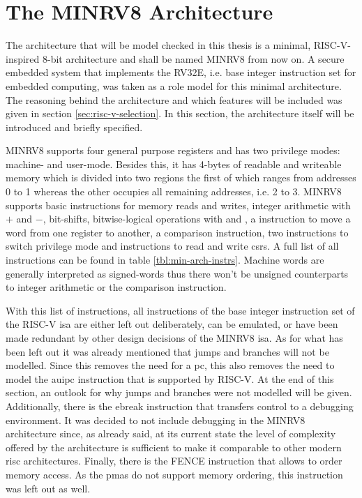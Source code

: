 \section{The MINRV8 Architecture}
\label{sec:minrv8}

The architecture that will be model checked in this thesis is a minimal, RISC-V-inspired 8-bit architecture and shall be named MINRV8 from now on.
A secure embedded system that implements the RV32E, i.e. base integer instruction set for embedded computing, was taken as a role model for this minimal architecture.
The reasoning behind the architecture and which features will be included was given in section \ref{sec:risc-v-selection}.
In this section, the architecture itself will be introduced and briefly specified.

MINRV8 supports four general purpose registers and has two privilege modes: machine- and user-mode.
Besides this, it has 4-bytes of readable and writeable memory which is divided into two regions the first of which ranges from addresses 0 to 1 whereas the other occupies all remaining addresses, i.e. 2 to 3.
MINRV8 supports basic instructions for memory reads and writes, integer arithmetic with $ + $ and $ - $, bit-shifts, bitwise-logical operations with  and , a  instruction to move a word from one register to another, a comparison instruction, two instructions to switch privilege mode and instructions to read and write \glspl{csr}.
A full list of all instructions can be found in table \ref{tbl:min-arch-instrs}.
Machine words are generally interpreted as signed-words thus there won't be unsigned counterparts to integer arithmetic or the comparison instruction.

With this list of instructions, all instructions of the base integer instruction set of the RISC-V \gls{isa} are either left out deliberately, can be emulated, or have been made redundant by other design decisions of the MINRV8 \gls{isa}.
As for what has been left out it was already mentioned that jumps and branches will not be modelled.
Since this removes the need for a \gls{pc}, this also removes the need to model the \gls{auipc} instruction that is supported by RISC-V.
At the end of this section, an outlook for why jumps and branches were not modelled will be given.
Additionally, there is the \gls{ebreak} instruction that transfers control to a debugging environment.
It was decided to not include debugging in the MINRV8 architecture since, as already said, at its current state the level of complexity offered by the architecture is sufficient to make it comparable to other modern \gls{risc} architectures.
Finally, there is the FENCE instruction that allows to order memory access.
As the \glspl{pma} do not support memory ordering, this instruction was left out as well.


